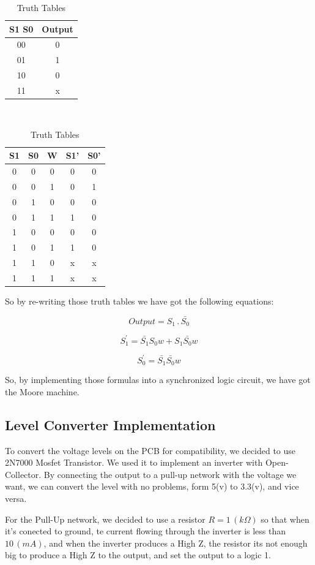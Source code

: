 \begin{table}[H]
\begin{centering}
\begin{tabular}{|c|c|}
\hline 
S1 S0 & Output\tabularnewline
\hline 
\hline 
00 & 0\tabularnewline
\hline 
01 & 1\tabularnewline
\hline 
10 & 0\tabularnewline
\hline 
11 & x\tabularnewline
\hline 
\end{tabular} ~%
\begin{tabular}{|c|c|c|c|c|}
\hline 
S1 & S0 & W & S1' & S0'\tabularnewline
\hline 
\hline 
0 & 0 & 0 & 0 & 0\tabularnewline
\hline 
0 & 0 & 1 & 0 & 1\tabularnewline
\hline 
0 & 1 & 0 & 0 & 0\tabularnewline
\hline 
0 & 1 & 1 & 1 & 0\tabularnewline
\hline 
1 & 0 & 0 & 0 & 0\tabularnewline
\hline 
1 & 0 & 1 & 1 & 0\tabularnewline
\hline 
1 & 1 & 0 & x & x\tabularnewline
\hline 
1 & 1 & 1 & x & x\tabularnewline
\hline 
\end{tabular}
\par\end{centering}
\caption{Truth Tables}
\label{3_t_2}

\end{table}

So by re-writing those truth tables we have got the following equations:

\begin{equation}
Output=S_{1}\,.\,\bar{S_{0}}\label{eq:3_1}
\end{equation}

\[
S_{1}^{'}=\bar{S_{1}}S_{0}w+S_{1}\bar{S_{0}}w
\]

\[
S_{0}^{'}=\bar{S_{1}}\bar{S_{0}}w
\]

So, by implementing those formulas into a synchronized logic circuit,
we have got the Moore machine.

\subsection{\color{purple}Level Converter Implementation}

To convert the voltage levels on the PCB for compatibility, we decided
to use 2N7000 Mosfet Transistor. We used it to implement an inverter
with Open-Collector. By connecting the output to a pull-up network
with the voltage we want, we can convert the level with no problems,
form 5(v) to 3.3(v), and vice versa.

For the Pull-Up network, we decided to use a resistor $R=1\,(k\Omega)$
so that when it's conected to ground, te current flowing through the
inverter is less than $10\,(mA)$, and when the inverter produces
a High Z, the resistor its not enough big to produce a High Z to the
output, and set the output to a logic 1.

